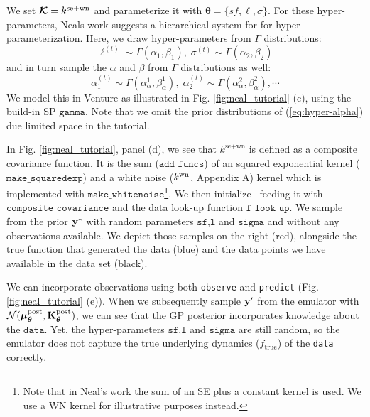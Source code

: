 We set $\bm{\mathcal{K}} = k^{\text{se}+\text{wn}}$ and parameterize it with $\bm{\theta}=\{sf,\ell,\sigma\}$.
For these hyper-parameters, Neals work suggests a hierarchical system for
for hyper-parameterization.
Here, we draw hyper-parameters from $\Gamma$ distributions:
\begin{equation}
\label{eq:hyper-ell}
\ell^{(t)} \sim \Gamma(\alpha_1,\beta_1),\;\sigma^{(t)} \sim \Gamma(\alpha_2,\beta_2)
\end{equation} 
and in turn sample the $\alpha$ and $\beta$ from $\Gamma$ distributions as well:
\begin{equation}
\label{eq:hyper-alpha}
\alpha_1^{(t)} \sim \Gamma(\alpha^1_{\alpha},\beta^1_{ \alpha } ),\; \alpha_2^{(t)} \sim \Gamma(\alpha^2_{\alpha},\beta^2_{\alpha}),\cdots
\end{equation}
We model this in Venture as illustrated in Fig. \ref{fig:neal_tutorial} (c),
using the build-in \ac{SP} $\texttt{gamma}$. Note that we omit the prior distributions of (\ref{eq:hyper-alpha}) due limited space in the tutorial.

In Fig. \ref{fig:neal_tutorial}, panel (d), we see that $k^{\text{se}+\text{wn}}$
is defined as a composite covariance function. It is the sum ($\texttt{add\_funcs}$) of
an squared exponential kernel ($\texttt{make\_squaredexp}$) and a white noise
($k^\text{wn}$, Appendix A)
kernel which is implemented with $\texttt{make\_whitenoise}$\footnote{Note
that in Neal's work \citeyearpar{neal1997monte} the sum of an SE
plus a constant kernel is used. We use a WN kernel for illustrative purposes
instead.}. 
We then initialize \gpmem\ feeding it with $\texttt{composite\_covariance}$ and the data
look-up function $\texttt{f\_look\_up}$. 
We sample from the prior $\mathbf{y}^*$ with random parameters $\texttt{sf,l}$ and $\texttt{sigma}$ and 
without any observations available.
We depict those samples on the right (red), alongside the true function that generated the data (blue) and
the data points we have available in the data set (black).

We can incorporate observations using both \texttt{observe} and \texttt{predict} (Fig. \ref{fig:neal_tutorial} (e)).
When we subsequently sample $\mathbf{y}^\prime$ from the emulator with
$\mathcal{N}(\bm{\mu}_{\bm{\theta}}^\text{post},\mathbf{K}_{\bm{\theta}}^\text{post})$, we can see that the \ac{GP} posterior incorporates knowledge 
about the $\texttt{data}$. Yet, the hyper-parameters $\texttt{sf,l}$ and $\texttt{sigma}$ are still
random, so the emulator does not capture the true underlying dynamics
($f_\text{true}$) of the \texttt{data} correctly. 

